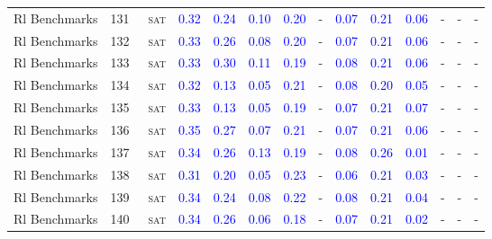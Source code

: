\begin{center}
{\begin{longtable}{@{}llllllllllllll@{}}
Rl Benchmarks & 131 & ~\textsc{sat} & \textcolor{blue}{0.32} & \textcolor{blue}{0.24} & \textcolor{blue}{0.10} & \textcolor{blue}{0.20} & - & \textcolor{blue}{0.07} & \textcolor{blue}{0.21} & \textcolor{blue}{0.06} & - & - & - \\
Rl Benchmarks & 132 & ~\textsc{sat} & \textcolor{blue}{0.33} & \textcolor{blue}{0.26} & \textcolor{blue}{0.08} & \textcolor{blue}{0.20} & - & \textcolor{blue}{0.07} & \textcolor{blue}{0.21} & \textcolor{blue}{0.06} & - & - & - \\
Rl Benchmarks & 133 & ~\textsc{sat} & \textcolor{blue}{0.33} & \textcolor{blue}{0.30} & \textcolor{blue}{0.11} & \textcolor{blue}{0.19} & - & \textcolor{blue}{0.08} & \textcolor{blue}{0.21} & \textcolor{blue}{0.06} & - & - & - \\
Rl Benchmarks & 134 & ~\textsc{sat} & \textcolor{blue}{0.32} & \textcolor{blue}{0.13} & \textcolor{blue}{0.05} & \textcolor{blue}{0.21} & - & \textcolor{blue}{0.08} & \textcolor{blue}{0.20} & \textcolor{blue}{0.05} & - & - & - \\
Rl Benchmarks & 135 & ~\textsc{sat} & \textcolor{blue}{0.33} & \textcolor{blue}{0.13} & \textcolor{blue}{0.05} & \textcolor{blue}{0.19} & - & \textcolor{blue}{0.07} & \textcolor{blue}{0.21} & \textcolor{blue}{0.07} & - & - & - \\
Rl Benchmarks & 136 & ~\textsc{sat} & \textcolor{blue}{0.35} & \textcolor{blue}{0.27} & \textcolor{blue}{0.07} & \textcolor{blue}{0.21} & - & \textcolor{blue}{0.07} & \textcolor{blue}{0.21} & \textcolor{blue}{0.06} & - & - & - \\
Rl Benchmarks & 137 & ~\textsc{sat} & \textcolor{blue}{0.34} & \textcolor{blue}{0.26} & \textcolor{blue}{0.13} & \textcolor{blue}{0.19} & - & \textcolor{blue}{0.08} & \textcolor{blue}{0.26} & \textcolor{blue}{0.01} & - & - & - \\
Rl Benchmarks & 138 & ~\textsc{sat} & \textcolor{blue}{0.31} & \textcolor{blue}{0.20} & \textcolor{blue}{0.05} & \textcolor{blue}{0.23} & - & \textcolor{blue}{0.06} & \textcolor{blue}{0.21} & \textcolor{blue}{0.03} & - & - & - \\
Rl Benchmarks & 139 & ~\textsc{sat} & \textcolor{blue}{0.34} & \textcolor{blue}{0.24} & \textcolor{blue}{0.08} & \textcolor{blue}{0.22} & - & \textcolor{blue}{0.08} & \textcolor{blue}{0.21} & \textcolor{blue}{0.04} & - & - & - \\
Rl Benchmarks & 140 & ~\textsc{sat} & \textcolor{blue}{0.34} & \textcolor{blue}{0.26} & \textcolor{blue}{0.06} & \textcolor{blue}{0.18} & - & \textcolor{blue}{0.07} & \textcolor{blue}{0.21} & \textcolor{blue}{0.02} & - & - & - \\

\end{longtable}}
\end{center}
